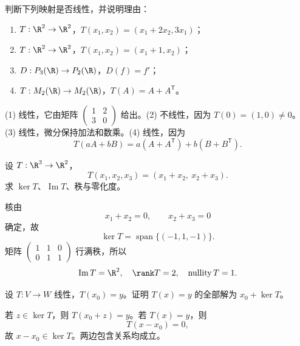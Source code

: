 %
%

\begin{exercise}[level=basic]
判断下列映射是否线性，并说明理由：
\begin{enumerate}[label=(\arabic*)]
\item $T:\R^2\to\R^2$，$T(x_1,x_2)=(x_1+2x_2,3x_1)$；
\item $T:\R^2\to\R^2$，$T(x_1,x_2)=(x_1+1,x_2)$；
\item $D:P_3(\R)\to P_2(\R)$，$D(f)=f'$；
\item $T:M_2(\R)\to M_2(\R)$，$T(A)=A+A^{\mathsf T}$。
\end{enumerate}
\begin{solution}
(1) 线性，它由矩阵 $\begin{pmatrix}1&2\\3&0\end{pmatrix}$ 给出。(2) 不线性，因为 $T(0)=(1,0)\ne0$。(3) 线性，微分保持加法和数乘。(4) 线性，因为
\[
T(aA+bB)=a(A+A^{\mathsf T})+b(B+B^{\mathsf T}).
\]
\end{solution}
\end{exercise}

\begin{exercise}[level=basic]
设 $T:\R^3\to\R^2$，
\[
T(x_1,x_2,x_3)=(x_1+x_2,\ x_2+x_3).
\]
求 $\ker T$、$\operatorname{Im}T$、秩与零化度。
\begin{solution}
核由
\[
x_1+x_2=0,\qquad x_2+x_3=0
\]
确定，故
\[
\ker T=\operatorname{span}\{(-1,1,-1)\}.
\]
矩阵 $\begin{pmatrix}1&1&0\\0&1&1\end{pmatrix}$ 行满秩，所以
\[
\operatorname{Im}T=\R^2,\quad
\rank T=2,\quad
\operatorname{nullity}T=1.
\]
\end{solution}
\end{exercise}

\begin{exercise}[level=basic]
设 $T:V\to W$ 线性，$T(x_0)=y$。证明 $T(x)=y$ 的全部解为 $x_0+\ker T$。
\begin{solution}
若 $z\in\ker T$，则 $T(x_0+z)=y$。若 $T(x)=y$，则
\[
T(x-x_0)=0,
\]
故 $x-x_0\in\ker T$。两边包含关系均成立。
\end{solution}
\end{exercise}

